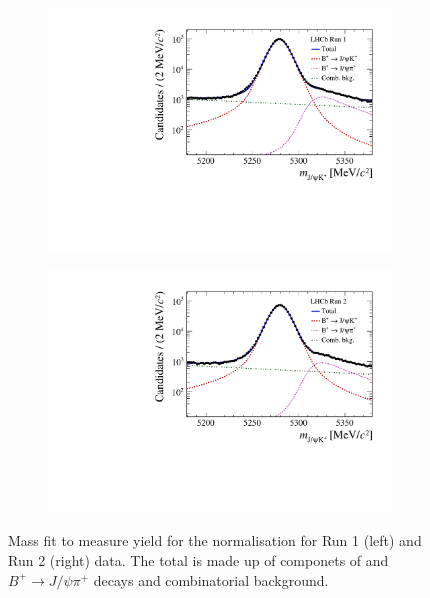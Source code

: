 {{\begin{figure}[htbp]
    \centering
   \begin{subfigure}[b]{0.48\textwidth}
        \includegraphics[width=  \textwidth]{./Figs/BFAnalysis/BuJpsiK_Run1.pdf}
    \end{subfigure}
    \begin{subfigure}[b]{0.48\textwidth}
       \includegraphics[width=\textwidth]{./Figs/BFAnalysis/BuJpsiK_Run2.pdf}
   \end{subfigure}
    \caption{ Mass fit to measure \bujpsik yield for the normalisation for Run 1 (left) and Run 2 (right) data. The total \pdf is made up of componets of \bujpsik and $B^{+} \to J/\psi \pi^{+}$ decays and combinatorial background.}
    \label{fig:Bujpsikyield}
\end{figure}


}}

